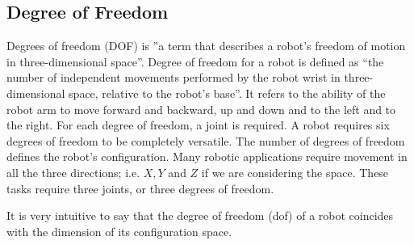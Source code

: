 
\subsection{Degree of Freedom}\label{subsec:degree-of-freedom2}

Degrees of freedom (DOF) is ”a term that describes a robot's freedom of motion in three-dimensional space”.
Degree of freedom for a robot is defined as “the number of independent movements performed by the robot wrist in three-dimensional space, relative to the robot's base”.
It refers to the ability of the robot arm to move forward and backward, up and down and to the left and to the right. For each degree of freedom, a joint is required.
A robot requires six degrees of freedom to be completely versatile.
The number of degrees of freedom defines the robot's configuration. Many robotic applications require movement in all the three directions; i.e. $X, Y$ and $Z$ if we are considering the space.
These tasks require three joints, or three degrees of freedom.

It is very intuitive to say that the degree of freedom (dof) of a robot coincides with the dimension of its configuration space.



